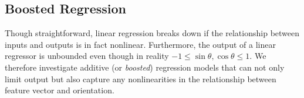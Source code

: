 \documentclass[runningheads,a4paper]{llncs}
\def\dtcwt{DT-$\mathbb{C}$WT}
\def\ie{i.e.}
\newcommand{\comment}[1]{}
\begin{document}


%


\subsection{Boosted Regression}
\label{s:learning_boosted}
Though straightforward, linear regression breaks down if the relationship between inputs and outputs is in fact nonlinear. Furthermore, the output of a linear regressor is unbounded even though in reality $-1 \leq \sin\theta,\cos\theta \leq 1$. We therefore investigate additive (or \emph{boosted}) regression models that can not only limit output but also capture any nonlinearities in the relationship between feature vector and orientation.
\end{document}
